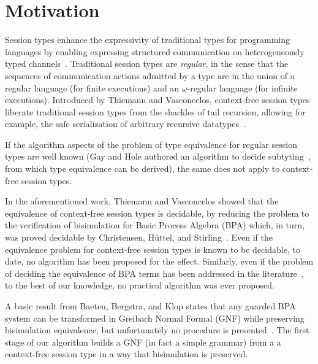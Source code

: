 \section{Motivation}
\label{sec:introduction}

Session types enhance the expressivity of traditional types for
programming languages by enabling expressing structured communication
on heterogeneously typed
channels~\cite{DBLP:conf/concur/Honda93,DBLP:conf/esop/HondaVK98,DBLP:conf/parle/TakeuchiHK94}.
%
Traditional session types are \emph{regular}, in the sense that the
sequences of communication actions admitted by a type are in the union
of a regular language (for finite executions) and an $\omega$-regular
language (for infinite executions).
%
Introduced by Thiemann and Vasconcelos, context-free session types
liberate traditional session types from the shackles of tail
recursion, allowing for example, the safe serialization of arbitrary
recursive datatypes~\cite{thiemann2016context}.

If the algorithm aspects of the problem of type equivalence for
regular session types are well known (Gay and Hole authored an
algorithm to decide subtyting~\cite{DBLP:journals/acta/GayH05}, from
which type equivalence can be derived), the same does not apply to
context-free session types.

In the aforementioned work, Thiemann and Vasconcelos showed that the
equivalence of context-free session types is decidable, by reducing
the problem to the verification of bisimulation for Basic Process
Algebra (BPA) which, in turn, was proved decidable by Christensen,
H{\"{u}}ttel, and Stirling~\cite{DBLP:journals/iandc/ChristensenHS95}.
%
Even if the equivalence problem for context-free session types is
known to be decidable, to date, no algorithm has been proposed for the
effect.
%
Similarly, even if the problem of deciding the equivalence of BPA
terms has been addressed in the
literature~\cite{DBLP:journals/iandc/ChristensenHS95,janvcar1999techniques},
to the best of our knowledge, no practical algorithm was ever
proposed.


A basic result from Baeten, Bergstra, and Klop states that any guarded
BPA system can be transformed in Greibach Normal Formal (GNF) while
preserving bisimulation equivalence, but unfortunately no procedure is
presented~\cite{baeten1993decidability}. The first stage of our
algorithm builds a GNF (in fact a simple grammar) from a a
context-free session type in a way that bisimulation is preserved.


